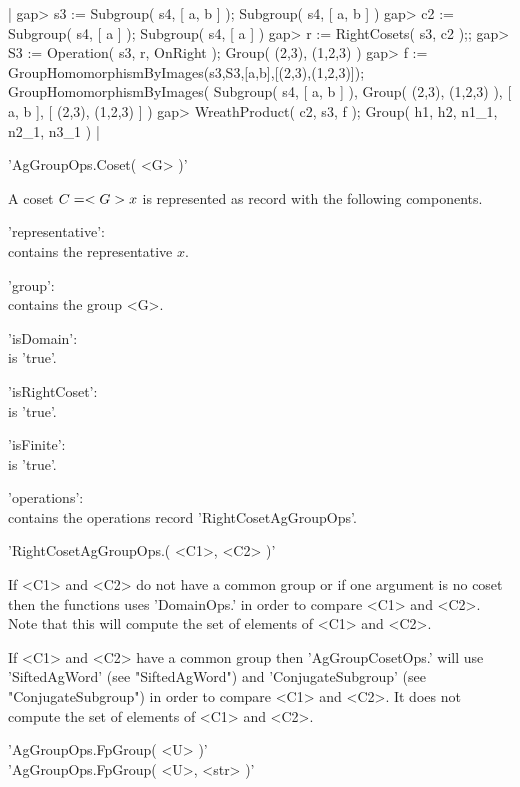 |    gap> s3 := Subgroup( s4, [ a, b ] );
    Subgroup( s4, [ a, b ] )
    gap> c2 := Subgroup( s4, [ a ] );
    Subgroup( s4, [ a ] )
    gap> r := RightCosets( s3, c2 );;
    gap> S3 := Operation( s3, r, OnRight );
    Group( (2,3), (1,2,3) )
    gap> f := GroupHomomorphismByImages(s3,S3,[a,b],[(2,3),(1,2,3)]);
    GroupHomomorphismByImages( Subgroup( s4, [ a, b ] ), Group( (2,3),
    (1,2,3) ), [ a, b ], [ (2,3), (1,2,3) ] )
    gap> WreathProduct( c2, s3, f );
    Group( h1, h2, n1_1, n2_1, n3_1 ) |


'AgGroupOps.Coset( <G> )'

A coset $C = <G>{\*}x$  is  represented  as record with  the following
components.

'representative': \\
        contains the representative $x$.

'group': \\
        contains the group <G>.

'isDomain': \\
        is 'true'.

'isRightCoset': \\
        is 'true'.

'isFinite': \\
    is 'true'.

'operations': \\
        contains the operations record 'RightCosetAgGroupOps'.

\vspace{5mm}
'RightCosetAgGroupOps.\<( <C1>, <C2> )'

If <C1> and  <C2>  do not have  a common group  or if one argument is  no
coset then the functions uses 'DomainOps.\<' in order to compare <C1> and
<C2>.  Note that this will compute the set of elements of <C1> and <C2>.

If <C1> and <C2>  have  a common group then 'AgGroupCosetOps.\<' will use
'SiftedAgWord'   (see   "SiftedAgWord")   and   'ConjugateSubgroup'  (see
"ConjugateSubgroup")  in  order to  compare  <C1> and <C2>. It  does  not
compute the set of elements of <C1> and <C2>.


'AgGroupOps.FpGroup( <U> )' \\
'AgGroupOps.FpGroup( <U>, <str> )'

